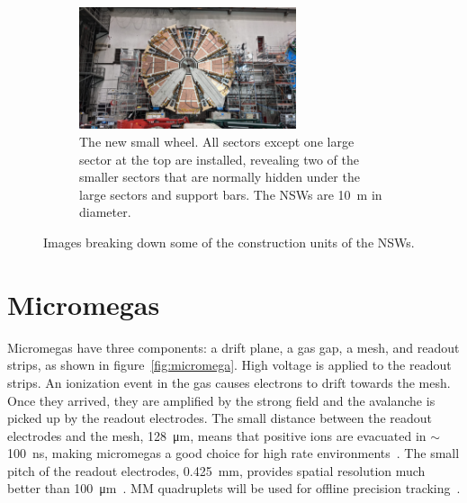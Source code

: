 \begin{figure}
\smallskip

\begin{subfigure}{\textwidth}
  \centering
  \includegraphics[width=0.7\textwidth]{figures/nsw_2021-05-27_landscape.jpeg}
  \caption{The new small wheel. All sectors except one large sector at the top are installed, revealing two of the smaller sectors that are normally hidden under the large sectors and support bars. The NSWs are \SI{10}{m} in diameter. }
  \label{fig:nsw}
  \end{subfigure}
\caption{Images breaking down some of the construction units of the NSWs.}
\label{fig:nsw_breakdown}
\end{figure}
\newpage
\restoregeometry


\section{Micromegas}

Micromegas have three components: a drift plane, a gas gap, a mesh, and readout strips, as shown in figure~\ref{fig:micromega}. High voltage is applied to the readout strips. An ionization event in the gas causes electrons to drift towards the mesh. Once they arrived, they are amplified by the strong field and the avalanche is picked up by the readout electrodes. The small distance between the readout electrodes and the mesh, \SI{128}{\micro\meter}, means that positive ions are evacuated in $\sim$\SI{100}{\nano\second}, making micromegas a good choice for high rate environments~\cite{nsw_tdr}. The small pitch of the readout electrodes, \SI{0.425}{mm}, provides spatial resolution much better than \SI{100}{\micro\meter}~\cite{stelzer_new_2016}. MM quadruplets will be used for offline precision tracking~\cite{nsw_tdr}.

